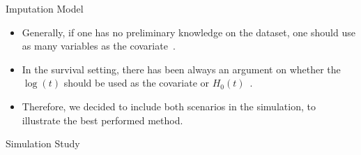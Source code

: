 \documentclass [aspectratio=169]{beamer}
\begin{document}
\begin{frame}{Imputation Model}
    \begin{itemize} 
        \item Generally, if one has no preliminary knowledge on the dataset, one should use as many variables as the covariate~\cite{rubin2018multiple}.
        \item In the survival setting, there has been always an argument on whether the $\log(t)$ should be used as the covariate or $H_0(t)$~\cite{white2009imputing}. 
        \item Therefore, we decided to include both scenarios in the simulation, to illustrate the best performed method. 
    \end{itemize}
\end{frame}

\begin{frame}{Simulation Study}
    \begin{table}
    \caption{The Simulation Results for 50\% missing on "PRS" covariate using Gamma frailty model, with 200 families with 3228 observations in total. $M=5$, * denotes a $p<0.05$. }
    \end{table}
\end{frame}
\end{document}
